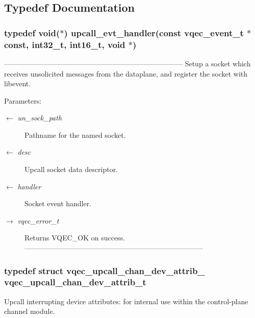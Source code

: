 \subsection{Typedef Documentation}
\subsubsection{\setlength{\rightskip}{0pt plus 5cm}typedef void($\ast$) \bf{upcall\_\-evt\_\-handler}(const vqec\_\-event\_\-t $\ast$const, int32\_\-t, int16\_\-t, void $\ast$)}\label{vqec__upcall__event_8c_983e701125b42492941c93c97d238da7}


--------------------------------------------------------------------------- Setup a socket which receives unsolicited messages from the dataplane, and register the socket with libevent.

\begin{Desc}
\item[Parameters:]
\begin{description}
\item[\mbox{$\leftarrow$} {\em un\_\-sock\_\-path}]Pathname for the named socket. \item[\mbox{$\leftarrow$} {\em desc}]Upcall socket data descriptor. \item[\mbox{$\leftarrow$} {\em handler}]Socket event handler. \item[\mbox{$\rightarrow$} {\em vqec\_\-error\_\-t}]Returns VQEC\_\-OK on success. --------------------------------------------------------------------------- \end{description}
\end{Desc}
\subsubsection{\setlength{\rightskip}{0pt plus 5cm}typedef struct \bf{vqec\_\-upcall\_\-chan\_\-dev\_\-attrib\_\-}  \bf{vqec\_\-upcall\_\-chan\_\-dev\_\-attrib\_\-t}}\label{vqec__upcall__event_8c_2e5d4040d68a79492c0b8580714645e5}


Upcall interrupting device attributes: for internal use within the control-plane channel module. 

